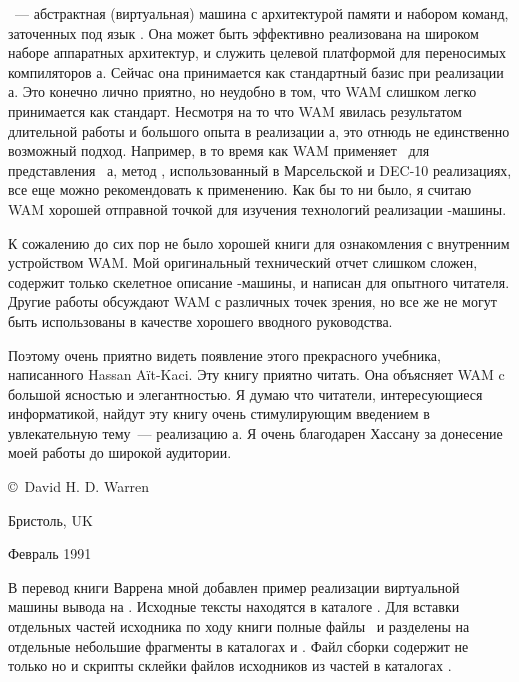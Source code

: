 \ --- абстрактная (виртуальная) машина с архитектурой памяти и набором
команд, заточенных под язык \prolog. Она может быть эффективно реализована на
широком наборе аппаратных архитектур, и служить целевой платформой для
переносимых компиляторов \prolog а. Сейчас она принимается как стандартный базис
при реализации \prolog а. Это конечно лично приятно, но неудобно в том, что WAM
слишком легко принимается как стандарт. Несмотря на то что WAM явилась
результатом длительной работы и большого опыта в реализации \prolog а, это
отнюдь не единственно возможный подход. Например, в то время как WAM применяет
\ для представления
\ \prolog а, метод , использованный в Марсельской и DEC-10 реализациях, все еще можно
рекомендовать к применению. Как бы то ни было, я считаю WAM хорошей отправной
точкой для изучения технологий реализации \prolog-машины.

К сожалению до сих пор не было хорошей книги для ознакомления с внутренним
устройством WAM. Мой оригинальный технический отчет слишком сложен, содержит
только скелетное описание \prolog-машины, и написан для опытного читателя.
Другие работы обсуждают WAM с различных точек зрения, но все же не могут быть
использованы в качестве хорошего вводного руководства.

Поэтому очень приятно видеть появление этого прекрасного учебника, написанного
Hassan A\"it-Kaci. Эту книгу приятно читать. Она объясняет WAM c большой
ясностью и элегантностью. Я думаю что читатели, интересующиеся информатикой,
найдут эту книгу очень стимулирующим введением в увлекательную тему\ ---
реализацию \prolog а. Я очень благодарен Хассану за донесение моей работы до
широкой аудитории.

\bigskip
\copyright\ David H. D. Warren

Бристоль, UK

Февраль 1991


В перевод книги Варрена мной добавлен пример
реализации виртуальной машины вывода на \cpp. Исходные тексты находятся в
каталоге
\href{https://github.com/ponyatov/boox/tree/master/prolog/warren}{}.
Для вставки отдельных частей исходника по ходу книги полные файлы
\ и  разделены на отдельные небольшие фрагменты в
каталогах  и . Файл сборки 
содержит не только  
 но и скрипты склейки файлов
исходников из частей в каталогах   .

